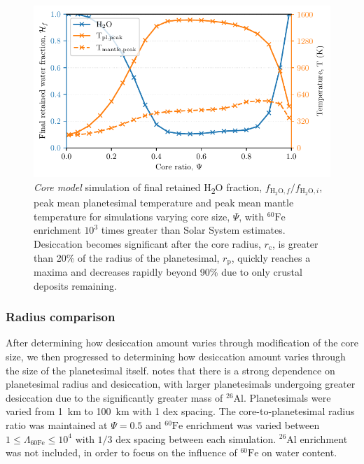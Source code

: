 \documentclass[fleqn,usenatbib]{mnras}
\newcommand{\rms}[1]{\ensuremath{_{\text{#1}}}}
\newcommand{\tsu}[1]{\textsubscript{#1}}
\newcommand{\atom}[2]{$^{#2}\text{#1}$}
\newcommand{\al}{\atom{Al}{26}}
\newcommand{\fe}{\atom{Fe}{60}}
\newcommand{\water}{{H\tsu{2}O}}
\newcommand{\waterfraci}{f_{\text{H}_2\text{O},i}}
\newcommand{\waterfracf}{f_{\text{H}_2\text{O},f}}
\newcommand{\waterfracfinal}{\waterfracf/\waterfraci}
\begin{document}
\begin{figure}
  \centering
  \includegraphics[scale=0.65]{assets/ratios.pdf}
  \caption{\emph{Core model} simulation of final retained \water{} fraction, $\waterfracfinal$, peak mean planetesimal temperature and peak mean mantle temperature for simulations varying core size, $\Psi$, with \fe{} enrichment $10^3$ times greater than Solar System estimates. Desiccation becomes significant after the core radius, $r\rms{c}$, is greater than 20\% of the radius of the planetesimal, $r\rms{p}$, quickly reaches a maxima and decreases rapidly beyond 90\% due to only crustal deposits remaining.}
  \label{fig:core-ratios}
\end{figure}

\subsubsection{Radius comparison}

After determining how desiccation amount varies through modification of the core size, we then progressed to determining how desiccation amount varies through the size of the planetesimal itself. 
\cite{lichtenbergWaterBudgetDichotomy2019} notes that there is a strong dependence on planetesimal radius and desiccation, with larger planetesimals undergoing greater desiccation due to the significantly greater mass of \al{}.
Planetesimals were varied from \SI{1}{km} to \SI{100}{km} with 1 dex spacing. 
The core-to-planetesimal radius ratio was maintained at $\Psi = 0.5$ and \fe{} enrichment was varied between $1 \leq \Lambda\rms{60Fe} \leq 10^4$ with $1/3$ dex spacing between each simulation.
\al{} enrichment was not included, in order to focus on the influence of \fe{} on water content.

\end{document}
